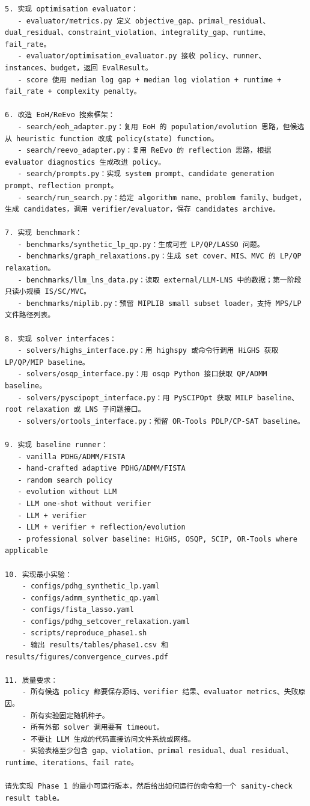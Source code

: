 \documentclass[12pt,a4paper]{ctexart}
\begin{document}
\begin{lstlisting}[style=bashstyle]
5. 实现 optimisation evaluator：
   - evaluator/metrics.py 定义 objective_gap、primal_residual、dual_residual、constraint_violation、integrality_gap、runtime、fail_rate。
   - evaluator/optimisation_evaluator.py 接收 policy、runner、instances、budget，返回 EvalResult。
   - score 使用 median log gap + median log violation + runtime + fail_rate + complexity penalty。

6. 改造 EoH/ReEvo 搜索框架：
   - search/eoh_adapter.py：复用 EoH 的 population/evolution 思路，但候选从 heuristic function 改成 policy(state) function。
   - search/reevo_adapter.py：复用 ReEvo 的 reflection 思路，根据 evaluator diagnostics 生成改进 policy。
   - search/prompts.py：实现 system prompt、candidate generation prompt、reflection prompt。
   - search/run_search.py：给定 algorithm name、problem family、budget，生成 candidates，调用 verifier/evaluator，保存 candidates archive。

7. 实现 benchmark：
   - benchmarks/synthetic_lp_qp.py：生成可控 LP/QP/LASSO 问题。
   - benchmarks/graph_relaxations.py：生成 set cover、MIS、MVC 的 LP/QP relaxation。
   - benchmarks/llm_lns_data.py：读取 external/LLM-LNS 中的数据；第一阶段只读小规模 IS/SC/MVC。
   - benchmarks/miplib.py：预留 MIPLIB small subset loader，支持 MPS/LP 文件路径列表。

8. 实现 solver interfaces：
   - solvers/highs_interface.py：用 highspy 或命令行调用 HiGHS 获取 LP/QP/MIP baseline。
   - solvers/osqp_interface.py：用 osqp Python 接口获取 QP/ADMM baseline。
   - solvers/pyscipopt_interface.py：用 PySCIPOpt 获取 MILP baseline、root relaxation 或 LNS 子问题接口。
   - solvers/ortools_interface.py：预留 OR-Tools PDLP/CP-SAT baseline。

9. 实现 baseline runner：
   - vanilla PDHG/ADMM/FISTA
   - hand-crafted adaptive PDHG/ADMM/FISTA
   - random search policy
   - evolution without LLM
   - LLM one-shot without verifier
   - LLM + verifier
   - LLM + verifier + reflection/evolution
   - professional solver baseline: HiGHS, OSQP, SCIP, OR-Tools where applicable

10. 实现最小实验：
    - configs/pdhg_synthetic_lp.yaml
    - configs/admm_synthetic_qp.yaml
    - configs/fista_lasso.yaml
    - configs/pdhg_setcover_relaxation.yaml
    - scripts/reproduce_phase1.sh
    - 输出 results/tables/phase1.csv 和 results/figures/convergence_curves.pdf

11. 质量要求：
    - 所有候选 policy 都要保存源码、verifier 结果、evaluator metrics、失败原因。
    - 所有实验固定随机种子。
    - 所有外部 solver 调用要有 timeout。
    - 不要让 LLM 生成的代码直接访问文件系统或网络。
    - 实验表格至少包含 gap、violation、primal residual、dual residual、runtime、iterations、fail rate。

请先实现 Phase 1 的最小可运行版本，然后给出如何运行的命令和一个 sanity-check result table。
\end{lstlisting}
\end{document}
